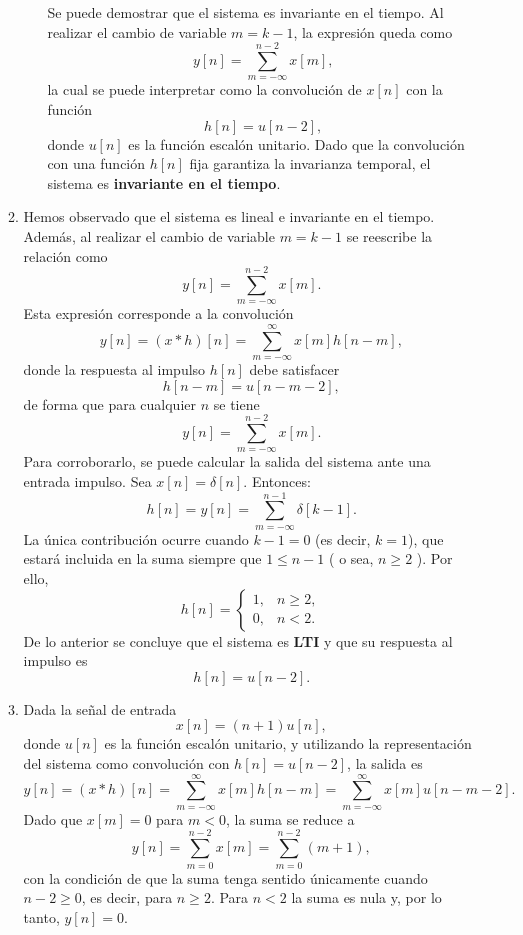 \begin{enumerate}[label=\color{red}\textbf{\arabic*)}]
\begin{enumerate}[label=\color{red}\textbf{\alph*)}]
\begin{itemize}[label=\textbullet]
            Se puede demostrar que el sistema es invariante en el tiempo. Al realizar el cambio de variable $m=k-1$, la expresión queda como  \[
                y[n]=\sum_{m=-\infty}^{n-2} x[m],
            \] la cual se puede interpretar como la convolución de $x[n]$ con la función  \[
            h[n]=u[n-2],
        \] donde $u[n]$ es la función escalón unitario. Dado que la convolución con una función  $h[n]$ fija garantiza la invarianza temporal, el sistema es  \textbf{invariante en el tiempo}. 
      \end{itemize}
    \item {}
        
        Hemos observado que el sistema es lineal e invariante en el tiempo. Además, al realizar el cambio de variable $m=k-1$ se reescribe la relación como \[
            y[n]=\sum_{m=-\infty}^{n-2}x[m]. 
        \] 
        Esta expresión corresponde a la convolución \[
            y[n]=(x\ast h)[n]=\sum_{m=-\infty}^{\infty} x[m]h[n-m],
        \] donde la respuesta al impulso $h[n]$ debe satisfacer  \[
        h[n-m]=u[n-m-2],
        \] de forma que para cualquier $n$ se tiene  \[
        y[n]=\sum_{m=-\infty}^{n-2} x[m].
        \] 
        Para corroborarlo, se puede calcular la salida del sistema ante una entrada impulso. Sea $x[n]=\delta[n]$. Entonces:  \[
            h[n]=y[n]=\sum_{m=-\infty}^{n-1}\delta[k-1]. 
        \] 
        La única contribución ocurre cuando $k-1=0$ (es decir, $k=1$), que estará incluida en la suma siempre que $1\le n-1$ ( o sea, $n\ge 2$ ). Por ello, \[
            h[n]=\begin{cases}
                1, & n\ge 2,\\
                0, & n<2.
            \end{cases}
        \] 
        De lo anterior se concluye que el sistema es \textbf{LTI} y que su respuesta al impulso es \[
            h[n]=u[n-2].
        \]  
    \item {}

        Dada la señal de entrada \[
            x[n]=(n+1)u[n],
        \] donde $u[n]$ es la función escalón unitario, y utilizando la representación del sistema como convolución con  $h[n]=u[n-2]$, la salida es  \[
        y[n]=(x\ast h)[n]=\sum_{m=-\infty}^{\infty} x[m]h[n-m]=\sum_{m=-\infty}^{\infty} x[m]u[n-m-2].
        \] 
        Dado que $x[m]=0$ para  $m<0$, la suma se reduce a  \[
            y[n]=\sum_{m=0}^{n-2} x[m]=\sum_{m=0}^{n-2}(m+1), 
        \] 
        con la condición de que la suma tenga sentido únicamente cuando $n-2\ge 0$, es decir, para $n\ge 2$. Para $n<2$ la suma es nula y, por lo tanto,  $y[n]=0$.


\end{enumerate}
\end{enumerate}
